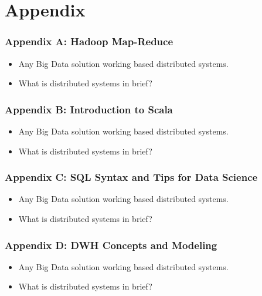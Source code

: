 \section{Appendix}


\begin{frame}
  \frametitle{Appendix A: Hadoop Map-Reduce}
	\begin{itemize}[<+->]
		\item Any Big Data solution working based distributed systems.
		\item What is distributed systems in brief?
	\end{itemize}
\end{frame}


\begin{frame}
  \frametitle{Appendix B: Introduction to Scala}
	\begin{itemize}[<+->]
		\item Any Big Data solution working based distributed systems.
		\item What is distributed systems in brief?
	\end{itemize}
\end{frame}


\begin{frame}
  \frametitle{Appendix C: SQL Syntax and Tips for Data Science}
	\begin{itemize}[<+->]
		\item Any Big Data solution working based distributed systems.
		\item What is distributed systems in brief?
	\end{itemize}
\end{frame}


\begin{frame}
  \frametitle{Appendix D: DWH Concepts and Modeling}
	\begin{itemize}[<+->]
		\item Any Big Data solution working based distributed systems.
		\item What is distributed systems in brief?
	\end{itemize}
\end{frame}

